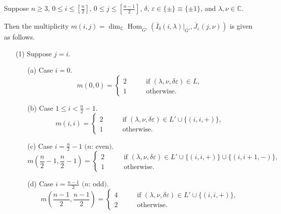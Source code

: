 \begin{theorem}
\label{thm:SOmult}
Suppose $n \ge 3$, $0 \le i\le [\frac n2]$, $0 \le j \le [\frac{n-1}2]$,
 $\delta$, $\varepsilon \in \{\pm \}\equiv \{ \pm 1\}$, 
 and $\lambda,\nu \in {\mathbb{C}}$.

Then the multiplicity 
$
   m(i,j)=
   \dim_{\mathbb{C}} \operatorname{Hom}_{{\overline{G'}}}
    ({\overline{I}}_{\delta}(i,\lambda)|_{{\overline{G'}}}, 
     {\overline{J}}_{\varepsilon}(j,\nu))
$
 is given as follows.  
\begin{enumerate}
\item[{\rm{(1)}}]
Suppose $j=i$.  
\begin{enumerate}
\item[{\rm{(a)}}]
Case $i=0$.
\begin{equation*}
m(0,0)
=
\begin{cases}
2
\qquad
&\text{if }
(\lambda, \nu, \delta\varepsilon) \in L, 
\\
1
&
\text{otherwise.}
\end{cases}
\end{equation*}
\item[{\rm{(b)}}]
Case $1 \le i < \frac  n2-1$.  
\begin{equation*}
m(i, i)
=
\begin{cases}
2
\qquad
&\text{if }
(\lambda, \nu, \delta \varepsilon) \in L' \cup \{(i,i,+)\},  
\\
1 
&
\text{otherwise}.  
\end{cases}
\end{equation*}
\item[{\rm{(c)}}]
Case $i= \frac n 2 -1$ $($$n$: even$)$.   
\begin{equation*}
m(\frac n 2 -1, \frac n 2 -1)
=
\begin{cases}
2
\qquad
&\text{if }
(\lambda, \nu, \delta\varepsilon) \in L' \cup \{(i,i,+)\}\cup \{(i,i+1,-)\},   
\\
1
&
\text{otherwise}.  
\end{cases}
\end{equation*}
\item[{\rm{(d)}}]
Case $i= \frac {n-1} 2$ $($$n$: odd$)$.   
\begin{equation*}
m(\frac {n-1} 2,\frac {n-1} 2)
=
\begin{cases}
4
\qquad
&\text{if }
(\lambda, \nu, \delta\varepsilon) \in L' \cup \{(i,i,+)\}, 
\\
2
&
\text{otherwise}.  
\end{cases}
\end{equation*}
\end{enumerate}


\end{enumerate}
\end{theorem}
